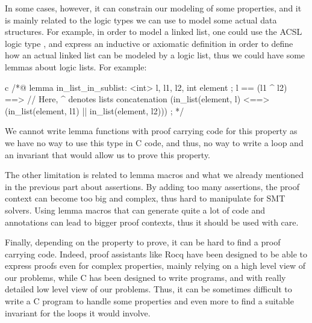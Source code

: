 In some cases, however, it can constrain our modeling of some properties, and
it is mainly related to the logic types we can use to model some actual data
structures. For example, in order to model a linked list, one could use the
ACSL logic type , and express an
inductive or axiomatic definition in order to define how an actual linked list
can be modeled by a logic list, thus we could have some lemmas about logic
lists. For example:

\begin{CodeBlock}{c}
/*@
  lemma in_list_in_sublist:
    \forall \list<int> l, l1, l2, int element ;
      l == (l1 ^ l2) ==>      // Here, ^ denotes lists concatenation
      (in_list(element, l) <==> (in_list(element, l1) || in_list(element, l2))) ;
*/
\end{CodeBlock}

We cannot write lemma functions with proof carrying code for this property as
we have no way to use this type in C code, and thus, no way to write a loop and
an invariant that would allow us to prove this property.


The other limitation is related to lemma macros and what we already mentioned
in the previous part about assertions. By adding too many assertions, the proof
context can become too big and complex, thus hard to manipulate for SMT
solvers. Using lemma macros that can generate quite a lot of code and annotations
can lead to bigger proof contexts, thus it should be used with care.


Finally, depending on the property to prove, it can be hard to find a proof
carrying code. Indeed, proof assistants like Rocq have been designed to be able
to express proofs even for complex properties, mainly relying on a high level
view of our problems, while C has been designed to write programs, and with
really detailed low level view of our problems. Thus, it can be sometimes
difficult to write a C program to handle some properties and even more to find
a suitable invariant for the loops it would involve.





